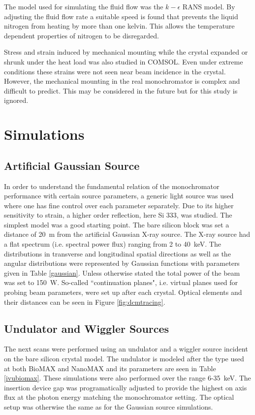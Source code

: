 \documentclass[preprint]{iucr}              %
\begin{document}
The model used for simulating the fluid flow was the $k-\epsilon$ RANS model. By adjusting the fluid flow rate a suitable speed is found that prevents the liquid nitrogen from heating by more than one kelvin. This allows the temperature dependent properties of nitrogen to be disregarded.

Stress and strain induced by mechanical mounting while the crystal expanded or shrunk under the heat load was also studied in COMSOL. Even under extreme conditions these strains were not seen near beam incidence in the crystal. However, the mechanical mounting in the real monochromator is complex and difficult to predict. This may be considered in the future but for this study is ignored.
\section{Simulations}

\subsection{Artificial Gaussian Source}
In order to understand the fundamental relation of the monochromator performance with certain source parameters, a generic light source was used where one has fine control over each parameter separately. Due to its higher sensitivity to strain, a higher order reflection, here Si 333, was studied. The simplest model was a good starting point. The bare silicon block was set a distance of 20~m from the artificial Gaussian X-ray source. The X-ray source had a flat spectrum (i.e. spectral power flux) ranging from 2 to 40~keV. The distributions in transverse and longitudinal spatial directions as well as the angular distributions were represented by Gaussian functions with parameters given in Table \ref{gaussian}. Unless otherwise stated the total power of the beam was set to 150~W. So-called ``continuation planes", i.e. virtual planes used for probing beam parameters, were set up after each crystal. Optical elements and their distances can be seen in Figure \ref{fig:dcmtracing}.

\subsection{Undulator and Wiggler Sources}\label{undulatorsource}
The next scans were performed using an undulator and a wiggler source incident on the bare silicon crystal model. The undulator is modeled after the type used at both BioMAX and NanoMAX and its parameters are seen in Table \ref{ivubiomax}. These simulations were also performed over the range 6-35~keV. The insertion device gap was programatically adjusted to provide the highest on axis flux at the photon energy matching the monochromator setting. The optical setup was otherwise the same as for the Gaussian source simulations.
\end{document}
